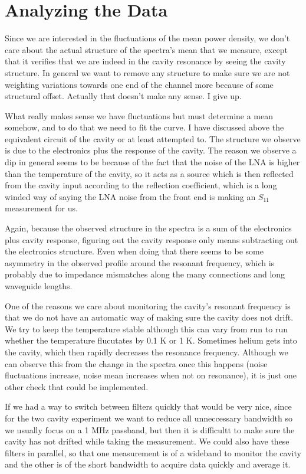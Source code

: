 \documentclass[11pt]{article}
\begin{document}
\section{Analyzing the Data}

Since we are interested in the fluctuations of the mean power density, we don't care about the actual structure of the spectra's mean that we measure, except that it verifies that we are indeed in the cavity resonance by seeing the cavity structure. In general we want to remove any structure to make sure we are not weighting variations towards one end of the channel more because of some structural offset. Actually that doesn't make any sense. I give up.

What really makes sense we have fluctuations but must determine a mean somehow, and to do that we need to fit the curve. I have discussed above the equivalent circuit of the cavity or at least attempted to. The structure we observe is due to the electronics plus the response of the cavity. The reason we observe a dip in general seems to be because of the fact that the noise of the LNA is higher than the temperature of the cavity, so it acts as a source which is then reflected from the cavity input according to the reflection coefficient, which is a long winded way of saying the LNA noise from the front end is making an $S_{11}$ measurement for us.

Again, because the observed structure in the spectra is a sum of the electronics plus cavity response, figuring out the cavity response only means subtracting out the electronics structure.  Even when doing that there seems to be some asymmetry in the observed profile around the resonant frequency, which is probably due to impedance mismatches along the many connections and long waveguide lengths. 

One of the reasons we care about monitoring the cavity's resonant frequency is that we do not have an automatic way of making sure the cavity does not drift. We try to keep the temperature stable although this can vary from run to run whether the temperature flucutates by 0.1 K or 1 K. Sometimes helium gets into the cavity, which then rapidly decreases the resonance frequency. Although we can observe this from the change in the spectra once this happens (noise fluctuations increase, noise mean increases when not on resonance), it is just one other check that could be implemented.


If we had a way to switch between filters quickly that would be very nice, since for the two cavity experiment we want to reduce all unneccessary bandwidth so we usually focus on a 1 MHz passband, but then it is difficultt to make sure the cavity has not drifted while taking the measurement. We could also have these filters in parallel, so that one measurement is of a wideband to monitor the cavity and the other is of the short bandwidth to acquire data quickly and average it.
\end{document}
